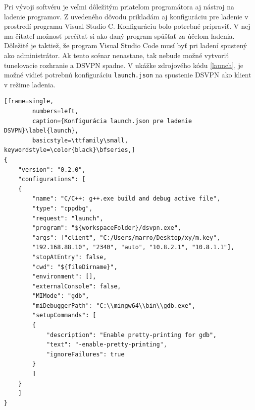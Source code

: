 Pri vývoji softvéru je veľmi dôležitým priateľom programátora aj nástroj na ladenie programov. Z uvedeného dôvodu prikladám aj konfiguráciu pre ladenie v prostredí programu Visual Studio C. Konfiguráciu bolo potrebné pripraviť. V nej ma čitateľ možnosť prečítať si ako daný program spúšťať za účelom ladenia. Dôležité je taktiež, že program Visual Studio Code musí byť pri ladení spustený ako administrátor. Ak tento scénar nenastane, tak nebude možné vytvoriť tunelovacie rozhranie a DSVPN spadne. V ukážke zdrojového kódu \ref{launch}, je možné vidieť potrebnú konfiguráciu \lstinline|launch.json| na spustenie DSVPN ako klient v režime ladenia. 

\begin{minipage}{\linewidth} 	
	\begin{lstlisting}[frame=single,
		numbers=left,
		caption={Konfigurácia launch.json pre ladenie DSVPN}\label{launch},
		basicstyle=\ttfamily\small, keywordstyle=\color{black}\bfseries,]
{
	"version": "0.2.0",
	"configurations": [
	{
		"name": "C/C++: g++.exe build and debug active file",
		"type": "cppdbg",
		"request": "launch",
		"program": "${workspaceFolder}/dsvpn.exe",
		"args": ["client", "C:/Users/marro/Desktop/xy/m.key", 
		"192.168.88.10", "2340", "auto", "10.8.2.1", "10.8.1.1"],
		"stopAtEntry": false,
		"cwd": "${fileDirname}",
		"environment": [],
		"externalConsole": false,
		"MIMode": "gdb",
		"miDebuggerPath": "C:\\mingw64\\bin\\gdb.exe",
		"setupCommands": [
		{
			"description": "Enable pretty-printing for gdb",
			"text": "-enable-pretty-printing",
			"ignoreFailures": true
		}
		]
	}
	]
}
	\end{lstlisting}
\end{minipage}\\